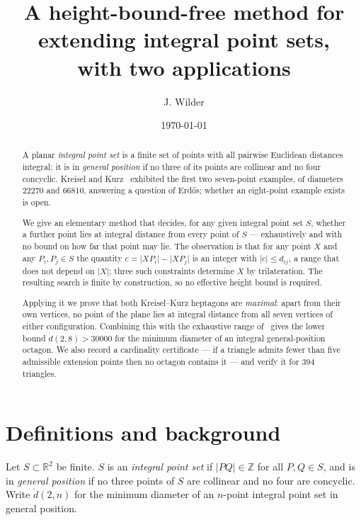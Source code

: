 \documentclass[11pt,reqno]{amsart}
\theoremstyle{plain}
\numberwithin{equation}{section}
\newcommand{\dgp}{\dot{d}}
\begin{document}
\title{A height-bound-free method for extending integral point sets,\\ with two applications}
\author{J. Wilder}
\date{\today}

\begin{abstract}
A planar \emph{integral point set} is a finite set of points with all pairwise Euclidean distances
integral; it is in \emph{general position} if no three of its points are collinear and no four
concyclic. Kreisel and Kurz~\cite{KK08} exhibited the first two seven-point examples, of diameters
$22270$ and $66810$, answering a question of Erd\H{o}s; whether an eight-point example exists is open.

We give an elementary method that decides, for any given integral point set $S$, whether a further
point lies at integral distance from every point of $S$ --- exhaustively and with no bound on how far
that point may lie. The observation is that for any point $X$ and any $P_i,P_j\in S$ the quantity
$c=\lvert XP_i\rvert-\lvert XP_j\rvert$ is an integer with $\lvert c\rvert\le d_{ij}$, a range that
does not depend on $\lvert X\rvert$; three such constraints determine $X$ by trilateration. The
resulting search is finite by construction, so no effective height bound is required.

Applying it we prove that both Kreisel--Kurz heptagons are \emph{maximal}: apart from their own
vertices, no point of the plane lies at integral distance from all seven vertices of either
configuration. Combining this with the exhaustive range of~\cite{KK08} gives the lower bound
$\dgp(2,8)>30000$ for the minimum diameter of an integral general-position octagon. We also record a
cardinality certificate --- if a triangle admits fewer than five admissible extension points then no
octagon contains it --- and verify it for $394$ triangles.
\end{abstract}

\maketitle

\section{Definitions and background}

Let $S\subset\mathbb{R}^2$ be finite. $S$ is an \emph{integral point set} if $\lvert PQ\rvert\in
\mathbb{Z}$ for all $P,Q\in S$, and is in \emph{general position} if no three points of $S$ are
collinear and no four are concyclic. Write $\dgp(2,n)$ for the minimum diameter of an $n$-point
integral point set in general position.
\end{document}
